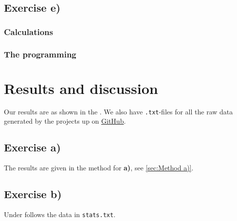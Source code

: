 \documentclass{article}
\begin{document}
\subsection{Exercise e)} \label{sec:Method e)}


  \subsubsection{Calculations}




  \subsubsection{The programming}





\vspace{1cm}

\section{Results and discussion} \label{sec:Results}

  Our results are as shown in the . We also have \texttt{.txt}-files for all the raw data generated by the projects up on \href{https://github.com/Erikbgram/Fys3150}{GitHub}. \\

  \subsection{Exercise a)} \label{sec:Results a)}

  The results are given in the method for \textbf{a)}, see \ref{sec:Method a)}.

  \subsection{Exercise b)} \label{sec:Results b)}

  Under follows the data in \texttt{stats.txt}.
\end{document}
